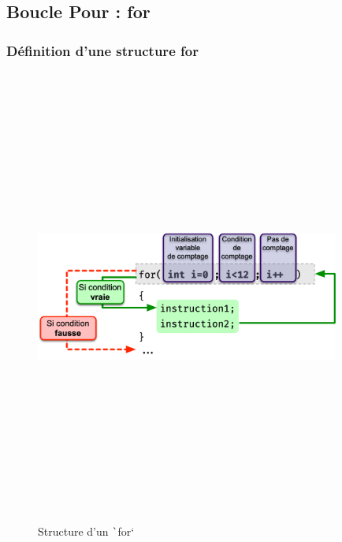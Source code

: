 \documentclass[10pt]{article}
\begin{document}
\subsection{Boucle Pour : for}

\subsubsection{Définition d'une structure for}

\smallskip
\begin{figure}[H]
    \includegraphics[max height=15cm,max width = 10cm]{assets/for.jpg}
    \centering
    \caption{Structure d'un \texttt`for`}
\end{figure}
\end{document}
